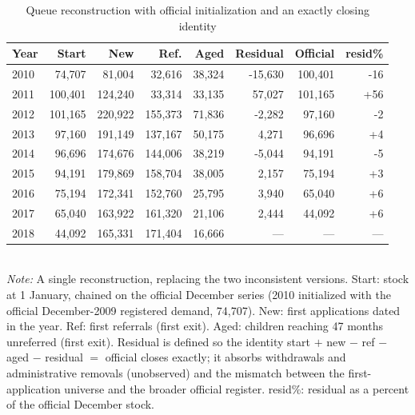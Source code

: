 \begin{table}[htbp]\centering
\caption{Queue reconstruction with official initialization and an exactly closing identity}
\label{tab:E4}
\footnotesize
\setlength{\tabcolsep}{4pt}
\begin{tabular}{lrrrrrrr}
\toprule
Year & Start & New & Ref. & Aged & Residual & Official & resid\% \\
\midrule
2010 & 74,707 & 81,004 & 32,616 & 38,324 & -15,630 & 100,401 & -16 \\
2011 & 100,401 & 124,240 & 33,314 & 33,135 & 57,027 & 101,165 & +56 \\
2012 & 101,165 & 220,922 & 155,373 & 71,836 & -2,282 & 97,160 & -2 \\
2013 & 97,160 & 191,149 & 137,167 & 50,175 & 4,271 & 96,696 & +4 \\
2014 & 96,696 & 174,676 & 144,006 & 38,219 & -5,044 & 94,191 & -5 \\
2015 & 94,191 & 179,869 & 158,704 & 38,005 & 2,157 & 75,194 & +3 \\
2016 & 75,194 & 172,341 & 152,760 & 25,795 & 3,940 & 65,040 & +6 \\
2017 & 65,040 & 163,922 & 161,320 & 21,106 & 2,444 & 44,092 & +6 \\
2018 & 44,092 & 165,331 & 171,404 & 16,666 & --- & --- & --- \\
\bottomrule
\end{tabular}
\\[3pt]{\footnotesize \textit{Note:} A single reconstruction, replacing the two inconsistent versions. Start: stock at 1 January, chained on the official December series (2010 initialized with the official December-2009 registered demand, 74{,}707). New: first applications dated in the year. Ref: first referrals (first exit). Aged: children reaching 47 months unreferred (first exit). Residual is defined so the identity start $+$ new $-$ ref $-$ aged $-$ residual $=$ official closes exactly; it absorbs withdrawals and administrative removals (unobserved) and the mismatch between the first-application universe and the broader official register. resid\%: residual as a percent of the official December stock.}
\end{table}
